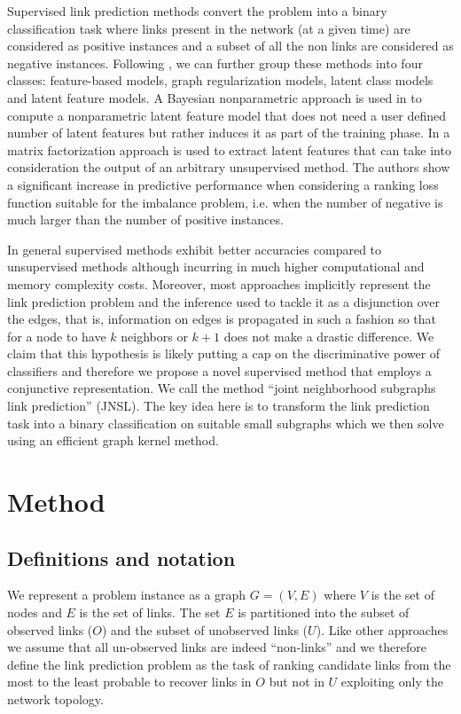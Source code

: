 \documentclass[runningheads,a4paper]{llncs}
\begin{document}
Supervised link prediction methods convert the problem into a binary classification task where links present in the network (at a given time) are considered as positive instances and a subset of all the non links are considered as negative instances. Following \cite{matrix-factorization}, we can further group these methods into four classes: feature-based models, graph regularization models, latent class models and latent feature models. 
A Bayesian nonparametric approach is used in \cite{nonparametric} to compute a nonparametric latent feature model that does not need a user defined number of latent features but rather induces it as part of the training phase. 
In \cite{matrix-factorization} a matrix factorization approach is used to extract latent features that can take into consideration the output of an arbitrary unsupervised method. The authors show a significant increase in predictive performance when considering a ranking loss function suitable for  the imbalance problem, i.e. when the number of negative is much larger than the number of positive instances. 

In general supervised methods exhibit better accuracies compared to unsupervised methods although incurring in much higher computational and memory complexity costs.
Moreover, most approaches implicitly represent the link prediction problem and the inference used to tackle it as a disjunction over the edges, that is, information on edges is propagated in such a fashion so that for a node to have $k$ neighbors or $k+1$ does not make a drastic difference.
We claim that this hypothesis is likely putting a cap on the discriminative power of classifiers and therefore we propose a novel supervised method that employs a conjunctive representation. We call the method ``joint neighborhood subgraphs link prediction'' (JNSL). The key idea here is to transform the link prediction task into a binary classification on suitable small subgraphs which we then solve using an efficient graph kernel method.


\section{Method}

\subsection{Definitions and notation}
We represent a problem instance as a graph $G=(V,E)$ where $V$ is the set of nodes and $E$ is the set of links. The set $E$ is partitioned into the subset of observed links ($O$) and the subset of unobserved links ($U$). Like other approaches we assume that all un-observed links are indeed ``non-links'' and we therefore define the link prediction problem as the task of ranking candidate links from the most to the least probable to recover links in $O$ but not in $U$ exploiting only the network topology.
\end{document}

